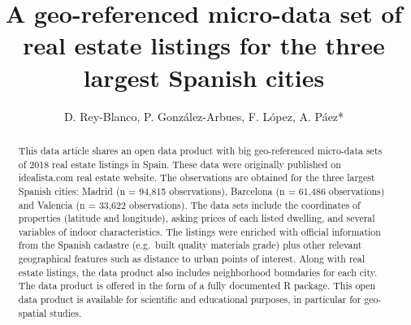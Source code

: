 \documentclass[Royal,times,sageh]{sagej}
\begin{document}

\title{A geo-referenced micro-data set of real estate listings for the
three largest Spanish cities}


\author{D. Rey-Blanco, P. González-Arbues, F.
López, A. Páez*}




\begin{abstract}
This data article shares an open data product with big geo-referenced
micro-data sets of 2018 real estate listings in Spain. These data were
originally published on idealista.com real estate website. The
observations are obtained for the three largest Spanish cities: Madrid
(n = 94,815 observations), Barcelona (n = 61,486 observations) and
Valencia (n = 33,622 observations). The data sets include the
coordinates of properties (latitude and longitude), asking prices of
each listed dwelling, and several variables of indoor characteristics.
The listings were enriched with official information from the Spanish
cadastre (e.g.~built quality materials grade) plus other relevant
geographical features such as distance to urban points of interest.
Along with real estate listings, the data product also includes
neighborhood boundaries for each city. The data product is offered in
the form of a fully documented R package. This open data product is
available for scientific and educational purposes, in particular for
geo-spatial studies.
\end{abstract}


\maketitle
\end{document}
